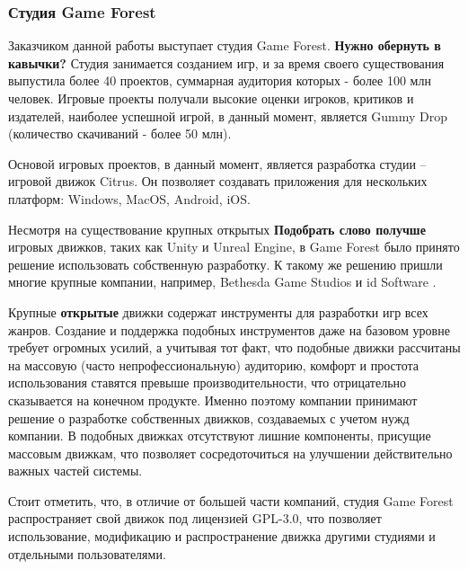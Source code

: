 \documentclass{fefu}
\begin{document}
			\subsubsection{Студия Game Forest}
				\par Заказчиком данной работы выступает студия Game Forest. \cite{GFPortal} 
				\textbf{Нужно обернуть в кавычки?} Студия занимается созданием игр, и
				за время своего существования выпустила более 40 проектов, суммарная аудитория 
				которых - более 100 млн человек. Игровые проекты получали высокие оценки
				игроков, критиков и издателей, наиболее успешной игрой, в данный момент,
				является Gummy Drop (количество скачиваний - более 50 млн). 
				\cite{GummyDropPage}
				\par Основой игровых проектов, в данный момент, является разработка студии -- 
				игровой движок Citrus. Он позволяет создавать приложения для нескольких
				платформ: Windows, MacOS, Android, iOS.
				\par Несмотря на существование крупных открытых \textbf{Подобрать
				слово получше} игровых движков, таких как Unity и Unreal Engine, в Game Forest
				было принято решение использовать собственную разработку. К такому же решению
				пришли многие крупные компании, например, Bethesda Game Studios 
				\cite{BethesdaEngine} и id Software \cite{idSoftwareEngine}.
				\par Крупные \textbf{открытые} движки содержат инструменты для разработки игр
				всех жанров. Создание и поддержка подобных инструментов даже на базовом уровне
				требует огромных усилий, а учитывая тот факт, что подобные движки рассчитаны
				на массовую (часто непрофессиональную) аудиторию, комфорт и простота
				использования ставятся превыше производительности, что отрицательно сказывается
				на конечном продукте. Именно поэтому компании принимают решение о разработке
				собственных движков, создаваемых с учетом нужд компании. В подобных движках
				отсутствуют лишние компоненты, присущие массовым движкам, что позволяет
				сосредоточиться на улучшении действительно важных частей системы.
				\par Стоит отметить, что, в отличие от большей части компаний, студия Game
				Forest распространяет свой движок под лицензией GPL-3.0, что позволяет
				использование, модификацию и распространение движка другими студиями и
				отдельными пользователями.
\end{document}
